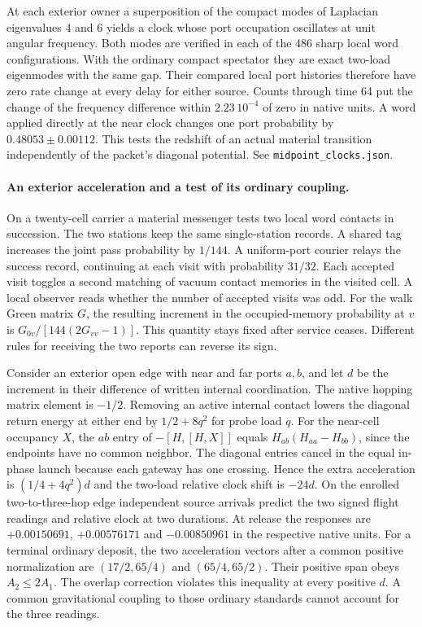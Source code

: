 \documentclass[11pt]{article}
\begin{document}
At each exterior owner a superposition of the compact modes of
Laplacian eigenvalues 4 and 6 yields a clock whose port occupation
oscillates at unit angular frequency. Both modes are verified in
each of the 486 sharp local word configurations. With the ordinary
compact spectator they are exact two-load eigenmodes with the same
gap. Their compared local port histories therefore have zero rate
change at every delay for either source. Counts through time 64
put the change of the frequency difference within \(2.23\,10^{-4}\)
of zero in native units. A word applied directly at the near clock
changes one port probability by \(0.48053\pm0.00112\). This tests
the redshift of an actual material transition independently of the
packet's diagonal potential. See \texttt{midpoint\_clocks.json}.

\paragraph{An exterior acceleration and a test of its ordinary coupling.}
On a twenty-cell carrier a material messenger tests two local word contacts
in succession. The two stations keep the same single-station records.
A shared tag increases the joint pass probability by $1/144$. A
uniform-port courier relays the success record, continuing at each visit
with probability $31/32$. Each accepted visit toggles a second matching of
vacuum contact memories in the visited cell. A local observer reads whether
the number of accepted visits was odd. For the walk Green matrix $G$,
the resulting increment in the occupied-memory probability at $v$ is
$G_{0v}/[144(2G_{vv}-1)]$. This quantity stays fixed after service ceases.
Different rules for receiving the two reports can reverse its sign.

Consider an exterior open edge with near and far ports $a,b$, and let $d$
be the increment in their difference of written internal coordination.
The native hopping matrix element is $-1/2$. Removing an active internal
contact lowers the diagonal return energy at either end by $1/2+8q^2$
for probe load $q$. For the near-cell occupancy $X$, the $ab$ entry of
$-[H,[H,X]]$ equals $H_{ab}(H_{aa}-H_{bb})$, since the endpoints have
no common neighbor. The diagonal entries cancel in the equal in-phase
launch because each gateway has one crossing. Hence the extra acceleration
is $(1/4+4q^2)d$ and the two-load relative clock shift is $-24d$.
On the enrolled two-to-three-hop edge independent source arrivals predict
the two signed flight readings and relative clock at two durations.
At release the responses are $+0.00150691$, $+0.00576171$ and $-0.00850961$
in the respective native units. For a terminal ordinary deposit, the two
acceleration vectors after a common positive normalization are
$(17/2,65/4)$ and $(65/4,65/2)$. Their positive span obeys $A_2\le2A_1$.
The overlap correction violates this inequality at every positive $d$.
A common gravitational coupling to those ordinary standards cannot account
for the three readings.
\end{document}
